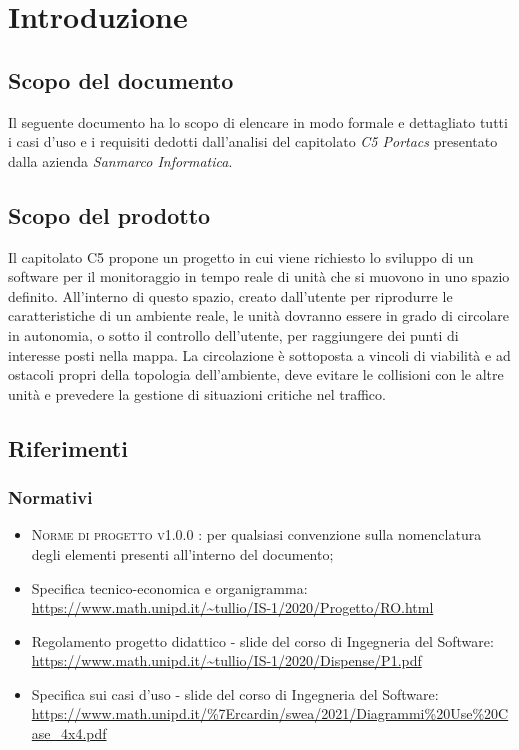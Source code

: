 \section{Introduzione}
\subsection{Scopo del documento}
Il seguente documento ha lo scopo di elencare in modo formale e dettagliato tutti i casi d’uso e i requisiti dedotti dall’analisi del capitolato \textit{C5 Portacs} presentato dalla azienda \textit{Sanmarco Informatica}.

\subsection{Scopo del prodotto}
Il capitolato C5 propone un progetto in cui viene richiesto lo sviluppo di un software per il monitoraggio in tempo reale di unità che si muovono in uno spazio definito. All’interno di questo spazio, creato dall’utente per riprodurre le caratteristiche di un ambiente reale, le unità dovranno essere in grado di circolare in autonomia, o sotto il controllo dell’utente, per raggiungere dei punti di interesse posti nella mappa.  La circolazione è sottoposta a vincoli di viabilità e ad ostacoli propri della topologia dell’ambiente, deve evitare le collisioni con le altre unità e prevedere la gestione di situazioni critiche nel traffico.

\subsection{Riferimenti}
\subsubsection{Normativi}
\begin{itemize}
\item \textsc{Norme di progetto v1.0.0 }: per qualsiasi convenzione sulla nomenclatura degli elementi presenti all’interno del documento;
\item Specifica tecnico-economica e organigramma: \\ \url{https://www.math.unipd.it/~tullio/IS-1/2020/Progetto/RO.html}
\item Regolamento progetto didattico - slide del corso di Ingegneria del Software: \\ \url{https://www.math.unipd.it/~tullio/IS-1/2020/Dispense/P1.pdf}
\item Specifica sui casi d'uso - slide del corso di Ingegneria del Software: \\ \url{https://www.math.unipd.it/%7Ercardin/swea/2021/Diagrammi%20Use%20Case_4x4.pdf}
\end{itemize}
